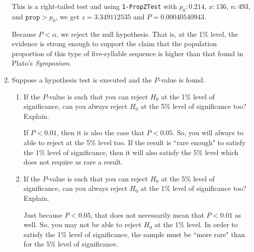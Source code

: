 \begin{enumerate}
{This is a right-tailed test and using \texttt{1-PropZTest} with $p_0: 0.214$, $x: 136$, $n: 493$, and $\texttt{prop} > p_0$, we get $z = 3.349112535$ and $P = 0.00040540943$. 

Because $P < \alpha$, we reject the null hypothesis. That is, at the 1\% level, the evidence is strong enough to support the claim that the population proportion of this type of five-syllable sequence is higher than that found in Plato's {\em Symposium}. } 
 


\item Suppose a hypothesis test is executed and the $P$-value is found. 
	\begin{enumerate}
	\item If the $P$-value is such that you can reject $H_0$ at the 1\% level of significance, can you always reject $H_0$ at the 5\% level of significance too? Explain. 
	
	{\answer If $P<0.01$, then it is also the case that $P<0.05$. So, you will always to able to reject at the 5\% level too. If the result is ``rare enough" to satisfy the 1\% level of significance, then it will also satisfy the 5\% level which does not require as rare a result.} 
	 
	
	\item If the $P$-value is such that you can reject $H_0$ at the 5\% level of significance, can you always reject $H_0$ at the 1\% level of significance too? Explain. 
	
	{\answer Just because $P < 0.05$, that does not necessarily mean that $P < 0.01$ as well. So, you may not be able to reject $H_0$ at the 1\% level. In order to satisfy the 1\% level of significance, the sample must be ``more rare" than for the 5\% level of significance.}
	 
	\end{enumerate}


\end{enumerate}

